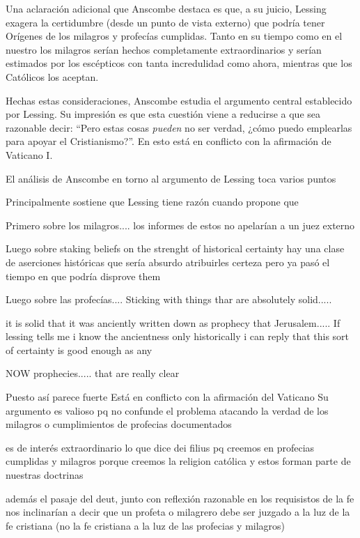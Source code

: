 Una aclaración adicional que Anscombe destaca es que, a su juicio, Lessing
exagera la certidumbre (desde un punto de vista externo) que podría tener
Orígenes de los milagros y profecías cumplidas. Tanto en su tiempo como en el
nuestro los milagros serían hechos completamente extraordinarios y serían
estimados por los escépticos con tanta incredulidad como ahora, mientras que los
Católicos los aceptan.

Hechas estas consideraciones, Anscombe estudia el argumento central establecido
por Lessing. Su impresión es que esta cuestión viene a reducirse a que sea
razonable decir: \enquote{Pero estas cosas \emph{pueden} no ser verdad, ¿cómo
  puedo emplearlas para apoyar el Cristianismo?}. En esto está en conflicto con
la afirmación de Vaticano I.

El análisis de Anscombe en torno al argumento de Lessing toca varios puntos

Principalmente sostiene que Lessing tiene razón cuando propone que

Primero sobre los milagros....
los informes de estos no apelarían a un juez externo

Luego sobre staking beliefs on the strenght of historical certainty
hay una clase de aserciones históricas que sería absurdo atribuirles certeza
pero ya pasó el tiempo en que podría disprove them

Luego sobre las profecías....
Sticking with things thar are absolutely solid.....

it is solid that it was anciently written down as prophecy
that Jerusalem.....
If lessing tells me i know the ancientness only historically i can reply that
this sort of certainty is good enough as any

NOW prophecies..... that are really clear


Puesto así parece fuerte
Está en conflicto con la afirmación del Vaticano
Su argumento es valioso pq no confunde el problema atacando la verdad de los
milagros o cumplimientos de profecias documentados

es de interés extraordinario lo que dice dei filius pq
creemos en profecias cumplidas y milagros porque creemos la religion católica
y estos forman parte de nuestras doctrinas

además
el pasaje del deut, junto con reflexión razonable en los requisistos de la fe
nos inclinarían a decir que un profeta o milagrero debe ser juzgado a la luz de
la fe cristiana (no la fe cristiana a la luz de las profecias y milagros)

